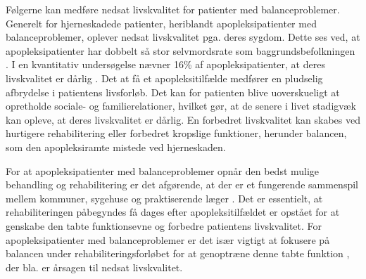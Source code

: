 Følgerne kan medføre nedsat livskvalitet for patienter med balanceproblemer. Generelt for hjerneskadede patienter, heriblandt apopleksipatienter med balanceproblemer, oplever nedsat livskvalitet pga. deres sygdom. Dette ses ved, at apopleksipatienter har dobbelt så stor selvmordsrate som baggrundsbefolkningen \cite{Sundhedsstyrelsen2010}. I en kvantitativ undersøgelse nævner 16\%  af apopleksipatienter, at deres livskvalitet er dårlig  \cite{Sundhedsstyrelsen2010}. Det at få et apopleksitilfælde medfører en pludselig afbrydelse i patientens livsforløb. Det kan for patienten blive uoverskueligt at opretholde sociale- og familierelationer, hvilket gør, at de senere i livet stadigvæk kan opleve, at deres livskvalitet er dårlig. En forbedret livskvalitet kan skabes ved hurtigere rehabilitering eller forbedret kropslige funktioner, herunder balancen, som den apopleksiramte mistede ved hjerneskaden.  \cite{Sundhedsstyrelsen2010}

For at apopleksipatienter med balanceproblemer opnår den bedst mulige behandling og rehabilitering er det afgørende, at der er et fungerende sammenspil mellem kommuner, sygehuse og praktiserende læger \cite{Sundhedsstyrelsen2010}. Det er essentielt, at rehabiliteringen påbegyndes få dages efter apopleksitilfældet er opstået for at genskabe den tabte funktionsevne og forbedre patientens livskvalitet. \cite{kruuse2015} For apopleksipatienter med balanceproblemer er det især vigtigt at fokusere på balancen under rehabiliteringsforløbet for at genoptræne denne tabte funktion , der bla. er årsagen til nedsat livskvalitet. 




